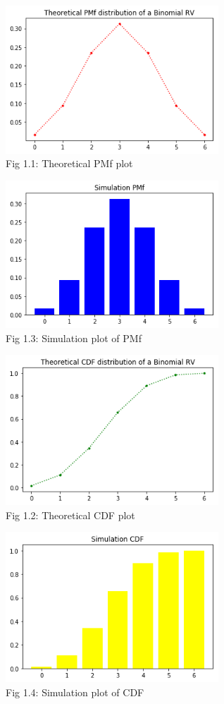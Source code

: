 \documentclass[journal,12pt,twocolumn]{IEEEtran}
\begin{document}
\begin{figure}[h!]
    \includegraphics[width=8cm]{Assignment-4/Codes/Figures/theo_pmf.png}
    \caption*{Fig 1.1: Theoretical PMf plot}
\end{figure}
\begin{figure}[h!]
    \includegraphics[width=8cm]{Assignment-4/Codes/Figures/sim_pmf.png}
    \caption*{Fig 1.3: Simulation plot of PMf}
\end{figure}
\begin{figure}[h!]
    \includegraphics[width=8cm]{Assignment-4/Codes/Figures/theo_cdf.png}
    \caption*{Fig 1.2: Theoretical CDF plot}
\end{figure}
\begin{figure}[h!]
    \includegraphics[width=8cm]{Assignment-4/Codes/Figures/sim_cdf.png}
    \caption*{Fig 1.4: Simulation plot of CDF}
\end{figure}
\end{document}

